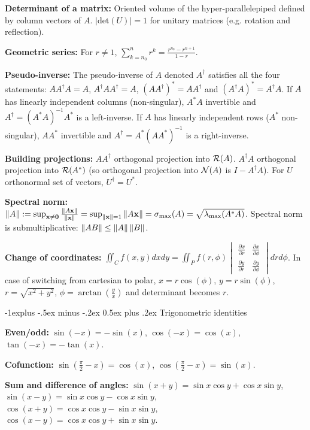 \documentclass{article}
\makeatletter
\renewcommand{\subsection}{\@startsection{subsection}{2}{0mm}%
                                {-1explus -.5ex minus -.2ex}%
                                {0.5ex plus .2ex}%
                                {\color{red!50!yellow}\normalfont\small\bfseries}}
\makeatother
\begin{document}
\begin{multicols*}{3}
    \textbf{Determinant of a matrix: }Oriented volume of the hyper-parallelepiped defined by column vectors of $A$. $|\text{det}(U)|=1$ for unitary matrices (e.g. rotation and reflection).
    
    \textbf{Geometric series: }For $r\neq 1$, $\sum_{k=n_0}^{n}r^k = \frac{r^{n_0}-r^{n+1}}{1-r}$.
    
    \textbf{Pseudo-inverse: }The pseudo-inverse of $A$ denoted $A^\dagger$ satisfies all the four statements: $AA^\dagger A=A$, $A^\dagger A A^\dagger=A$, $(AA^\dagger)^*=AA^\dagger$ and $(A^\dagger A)^*=A^\dagger A$. If $A$ has linearly independent columns (non-singular), $A^*A$ invertible and $A^\dagger=(A^*A)^{-1}A^*$ is a left-inverse. If $A$ has linearly independent rows ($A^*$ non-singular), $AA^*$ invertible and $A^\dagger=A^*(AA^*)^{-1}$ is a right-inverse.
    
    \textbf{Building projections: }$A A^\dagger$ orthogonal projection into $\mathcal{R}(A)$. $A^\dagger A$ orthogonal projection into $\mathcal{R}(A^*)$ (so orthogonal projection into $\mathcal{N}(A)$ is $I-A^\dagger A$). For $U$ orthonormal set of vectors, $U^\dagger = U^*$.
    
    \textbf{Spectral norm: }$\|A\|:=\sup_{\mathbf{x}\neq \mathbf{0}}\frac{\|A\mathbf{x}\|}{\|\mathbf{x}\|}=\sup_{\|\mathbf{x}\|=1}\|A\mathbf{x}\| = \sigma_{\max}(A) = \sqrt{\lambda_{\max} (A^* A)}$. Spectral norm is submultiplicative: $\left\lVert AB\right\rVert\leq \left\lVert A\right\rVert\left\lVert B\right\rVert$.
    
    \textbf{Change of coordinates: }$\iint_C f(x,y)dxdy=\iint_P f(r,\phi)\begin{vmatrix}\frac{\partial x}{\partial r} & \frac{\partial x}{\partial \phi} \\
    \frac{\partial y}{\partial r} & \frac{\partial y}{\partial \phi}\end{vmatrix} drd\phi$. In case of switching from cartesian to polar, $x=r\cos(\phi)$, $y=r\sin(\phi)$, $r=\sqrt{x^2+y^2}$, $\phi=\arctan\left(\frac{y}{x}\right)$ and determinant becomes $r$.
    
    \subsection{Trigonometric identities}
    
    \textbf{Even/odd: }$\sin(-x)=-\sin(x)$, $\cos(-x)=\cos(x)$, $\tan(-x)=-\tan(x)$.
    
    \textbf{Cofunction: }$\sin(\frac{\pi}{2}-x)=\cos(x)$, $\cos(\frac{\pi}{2}-x)=\sin(x)$.
    
    \textbf{Sum and difference of angles: }$\sin(x + y) = \sin x \cos y + \cos x \sin y$, $\sin(x - y) = \sin x \cos y - \cos x \sin y$, $\cos(x + y) = \cos x \cos y - \sin x \sin y$, $\cos(x - y) = \cos x \cos y + \sin x \sin y$.
    

\end{multicols*}
\end{document}
